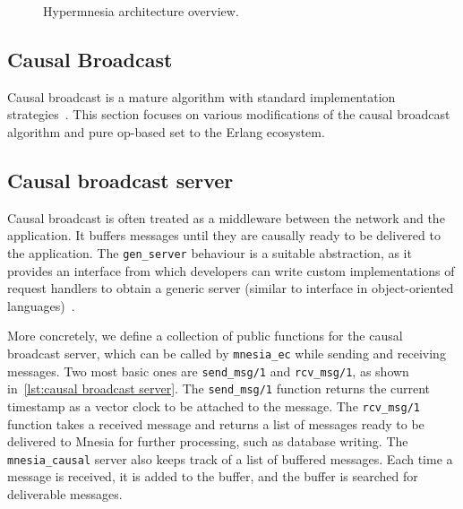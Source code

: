 \begin{figure*}
  \caption{Hypermnesia architecture overview.}
  \label{fig:hypermnesia arch}
\end{figure*}


\subsection{Causal Broadcast} \label{sec:impl cbcast}

Causal broadcast is a mature algorithm with standard implementation 
strategies~\cite{schmuck1988broadcast,birman1991causal}. This section focuses on various
modifications of the causal broadcast algorithm and pure op-based set 
to the Erlang ecosystem.

\subsection{Causal broadcast server}

Causal broadcast is often treated as a middleware between the
network and the application. It buffers messages until they are causally ready
to be delivered to the application. The \texttt{gen_server} behaviour
is a suitable abstraction, as it provides an interface from which
developers can write custom implementations of request handlers to obtain a
generic server (similar to interface in object-oriented 
languages)~\cite{ericssonab2023otpdesign}.

More concretely, we define a collection of public functions for the causal broadcast
server, which can be called by \texttt{mnesia_ec} while sending
and receiving messages. Two most basic ones are \texttt{send_msg/1}
and \texttt{rcv_msg/1}, as shown in~\cref{lst:causal broadcast server}.
The \texttt{send_msg/1} function returns the current timestamp
as a vector clock to be attached to the message.  The \texttt{rcv_msg/1}
function takes a received message and returns a list of messages ready to be
delivered to Mnesia for further processing, such as database writing.
The \verb|mnesia_causal| server also keeps track of a list of buffered messages.
Each time a message is received, it is added to the buffer, and the buffer is
searched for deliverable messages.


